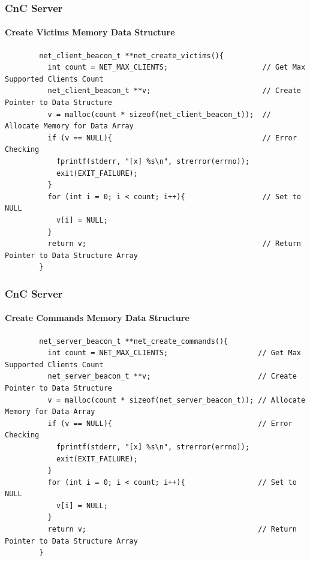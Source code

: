 \documentclass[aspectratio=169]{beamer}
\begin{document}
\begin{frame}[fragile]{}
  \frametitle{CnC Server}
  \framesubtitle{Create Victims Memory Data Structure}
  \begin{center}
    \begin{tcolorbox}[title=net.c,colback=black]
    \begin{minipage}{0.5\textwidth}
      \begin{verbatim}
        net_client_beacon_t **net_create_victims(){
          int count = NET_MAX_CLIENTS;                      // Get Max Supported Clients Count
          net_client_beacon_t **v;                          // Create Pointer to Data Structure
          v = malloc(count * sizeof(net_client_beacon_t));  // Allocate Memory for Data Array
          if (v == NULL){                                   // Error Checking
            fprintf(stderr, "[x] %s\n", strerror(errno));
            exit(EXIT_FAILURE);
          }
          for (int i = 0; i < count; i++){                  // Set to NULL
            v[i] = NULL;
          }
          return v;                                         // Return Pointer to Data Structure Array
        }
      \end{verbatim}
    \end{minipage}
    \end{tcolorbox}
  \end{center}
\end{frame}

\begin{frame}[fragile]{}
  \frametitle{CnC Server}
  \framesubtitle{Create Commands Memory Data Structure}
  \begin{center}
    \begin{tcolorbox}[title=net.c,colback=black]
    \begin{minipage}{0.5\textwidth}
      \begin{verbatim}
        net_server_beacon_t **net_create_commands(){
          int count = NET_MAX_CLIENTS;                     // Get Max Supported Clients Count
          net_server_beacon_t **v;                         // Create Pointer to Data Structure
          v = malloc(count * sizeof(net_server_beacon_t)); // Allocate Memory for Data Array
          if (v == NULL){                                  // Error Checking
            fprintf(stderr, "[x] %s\n", strerror(errno));
            exit(EXIT_FAILURE);
          }
          for (int i = 0; i < count; i++){                 // Set to NULL
            v[i] = NULL;
          }
          return v;                                        // Return Pointer to Data Structure Array
        }
      \end{verbatim}
    \end{minipage}
    \end{tcolorbox}
  \end{center}
\end{frame}
\end{document}
